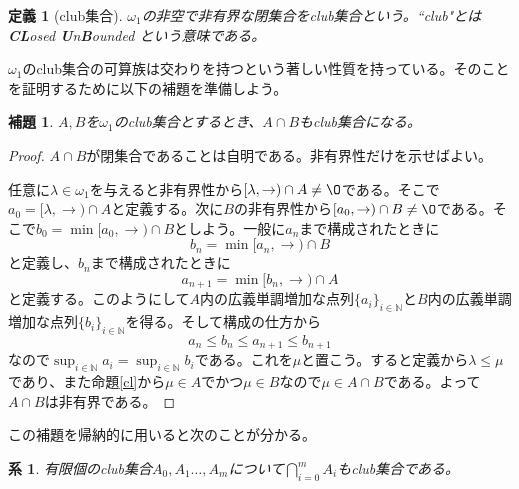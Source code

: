 \documentclass[leqno]{jsarticle}
\newtheorem{cor}[thm]{系}
\newtheorem{lem}[thm]{補題}
\newtheorem{df}[thm]{定義}
\newcommand{\nn}{\mathbb{N}}
\newcommand{\dpst}{\displaystyle}
\newcommand{\la}{\lambda}
\begin{document}
\begin{df}[club集合]\normalfont
$\omega_1$の非空で非有界な閉集合をclub集合という。``club"とは \textbf{CL}osed \textbf{U}n\textbf{B}ounded という意味である。
\end{df}
$\omega_1$のclub集合の可算族は交わりを持つという著しい性質を持っている。そのことを証明するために以下の補題を準備しよう。
\begin{lem}\label{lemma}\normalfont
$A,B$を$\omega_1$のclub集合とするとき、$A\cap B$もclub集合になる。
\end{lem}
\begin{proof}$A\cap B$が閉集合であることは自明である。非有界性だけを示せばよい。\par
任意に$\la\in \omega_1$を与えると非有界性から$[\la,\to)\cap A\neq \O$である。そこで$a_0=[\la,\to)\cap A$と定義する。次に$B$の非有界性から$[a_0,\to)\cap B\neq\O$である。そこで$b_0=\min [a_0,\to)\cap B$としよう。一般に$a_n$まで構成されたときに
\[
b_{n}=\min[a_n,\to)\cap B
\]
と定義し、$b_n$まで構成されたときに
\[
a_{n+1}=\min[b_n,\to)\cap A
\]
と定義する。このようにして$A$内の広義単調増加な点列$\{a_i\}_{i\in \nn}$と$B$内の広義単調増加な点列$\{b_i\}_{i\in\nn}$を得る。そして構成の仕方から
\[
a_n\le b_n\le a_{n+1}\le b_{n+1}
\]
なので$\dpst \sup_{i\in\nn}a_i=\sup_{i\in \nn}b_i$である。これを$\mu$と置こう。すると定義から$\la\le \mu$であり、また命題\ref{cl}から$\mu\in A$でかつ$\mu\in B$なので$\mu\in A\cap B$である。よって$A\cap B$は非有界である。
\end{proof}
この補題を帰納的に用いると次のことが分かる。
\begin{cor}\label{cap}\normalfont
有限個のclub集合$A_0,A_1\dots,A_m$について$\dpst \bigcap_{i=0}^mA_i$もclub集合である。
\end{cor}
\end{document}
